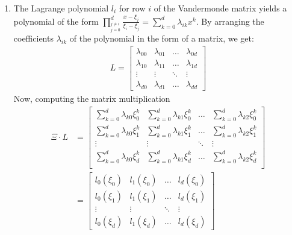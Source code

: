 \documentclass[11pt,a4paper]{article}
\begin{document}
\begin{enumerate}
	      \newpage

	\item The Lagrange polynomial $l_i$ for row $i$ of the Vandermonde matrix yields a polynomial of the form
	      $\prod^d_{_{j = 0}^{j \neq i}}\frac{x - \xi_j}{\xi_i - \xi_j} =  \sum_{k=0}^d
		      \lambda_{ik}x^k$. By arranging the coefficients $\lambda_{ik}$ of the polynomial in the form of a matrix, we get:
	      \begin{align*}
		      L = \begin{bmatrix}
			          \lambda_{00} & \lambda_{01} & \ldots & \lambda_{0d} \\
			          \lambda_{10} & \lambda_{11} & \ldots & \lambda_{1d} \\
			          \vdots       & \vdots       & \ddots & \vdots       \\
			          \lambda_{d0} & \lambda_{d1} & \ldots & \lambda_{dd}
		          \end{bmatrix}
	      \end{align*}
	      Now, computing the matrix multiplication
	      \begin{align*}
		      \Xi \cdot L & = \begin{bmatrix}
			                      \sum_{k= 0}^{d}\lambda_{k0}\xi_0^k & \sum_{k= 0}^{d}\lambda_{k1}\xi_0^k & \ldots & \sum_{k= 0}^{d}\lambda_{k2}\xi_0^k \\
			                      \sum_{k= 0}^{d}\lambda_{k0}\xi_1^k & \sum_{k= 0}^{d}\lambda_{k1}\xi_1^k & \ldots & \sum_{k= 0}^{d}\lambda_{k2}\xi_1^k \\
			                      \vdots                             & \vdots                             & \ddots & \vdots                             \\
			                      \sum_{k= 0}^{d}\lambda_{k0}\xi_d^k & \sum_{k= 0}^{d}\lambda_{k1}\xi_d^k & \ldots & \sum_{k= 0}^{d}\lambda_{k2}\xi_d^k \\
		                      \end{bmatrix} \\
		                  & = \begin{bmatrix}
			                      l_0(\xi_0) & l_1(\xi_0) & \ldots & l_d(\xi_0) \\
			                      l_0(\xi_1) & l_1(\xi_1) & \ldots & l_d(\xi_1) \\
			                      \vdots     & \vdots     & \ddots & \vdots     \\
			                      l_0(\xi_d) & l_1(\xi_d) & \ldots & l_d(\xi_d)

\end{bmatrix}
\end{align*}
\end{enumerate}
\end{document}
